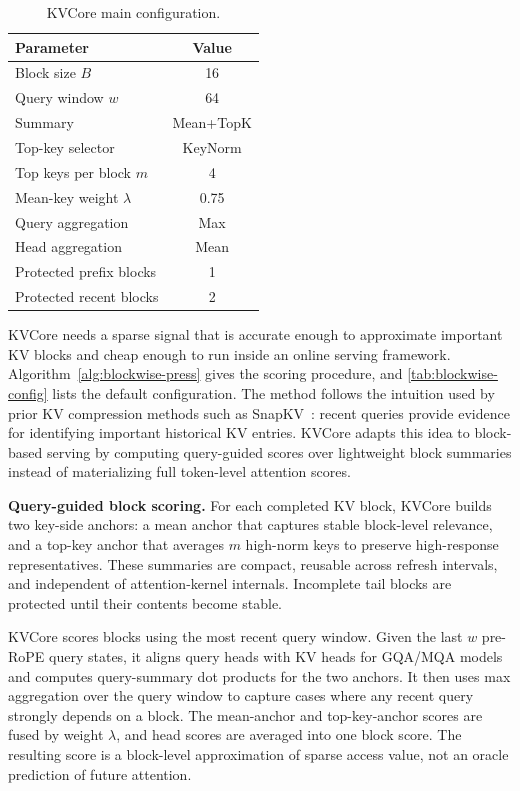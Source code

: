 \documentclass[sigplan,10pt,review,anonymous]{acmart}
\begin{document}
\begin{table}[t]
\centering
\small
\caption{KVCore main configuration.}
\label{tab:blockwise-config}
\begin{tabular}{lc}
\toprule
Parameter & Value \\
\midrule
Block size $B$ & 16 \\
Query window $w$ & 64 \\
Summary & Mean+TopK \\
Top-key selector & KeyNorm \\
Top keys per block $m$ & 4 \\
Mean-key weight $\lambda$ & 0.75 \\
Query aggregation & Max \\
Head aggregation & Mean \\
Protected prefix blocks & 1 \\
Protected recent blocks & 2 \\
\bottomrule
\end{tabular}
\end{table}

KVCore needs a sparse signal that is accurate enough to approximate important KV blocks and cheap enough to run inside an online serving framework.
Algorithm~\ref{alg:blockwise-press} gives the scoring procedure, and \autoref{tab:blockwise-config} lists the default configuration.
The method follows the intuition used by prior KV compression methods such as SnapKV~\cite{snapkv}: recent queries provide evidence for identifying important historical KV entries.
KVCore adapts this idea to block-based serving by computing query-guided scores over lightweight block summaries instead of materializing full token-level attention scores.

\noindent\textbf{Query-guided block scoring.}
For each completed KV block, KVCore builds two key-side anchors: a mean anchor that captures stable block-level relevance, and a top-key anchor that averages $m$ high-norm keys to preserve high-response representatives.
These summaries are compact, reusable across refresh intervals, and independent of attention-kernel internals.
Incomplete tail blocks are protected until their contents become stable.

KVCore scores blocks using the most recent query window.
Given the last $w$ pre-RoPE query states, it aligns query heads with KV heads for GQA/MQA models and computes query-summary dot products for the two anchors.
It then uses max aggregation over the query window to capture cases where any recent query strongly depends on a block.
The mean-anchor and top-key-anchor scores are fused by weight $\lambda$, and head scores are averaged into one block score.
The resulting score is a block-level approximation of sparse access value, not an oracle prediction of future attention.
\end{document}
